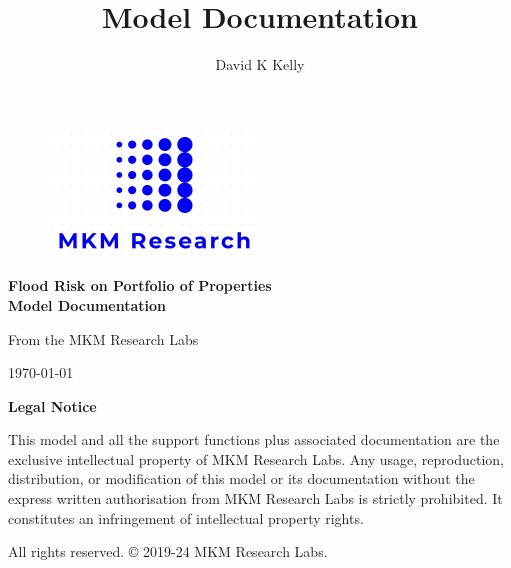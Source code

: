 \documentclass{article}
\title{Model Documentation}
\author{David K Kelly}
\date{}
\begin{document}
\begin{titlepage}
\begin{center}

\begin{figure}
	\centering
	\includegraphics[width=0.5\textwidth]{MKM.png}
\end{figure}

\vspace{2cm}

{\Huge\bfseries Flood Risk on Portfolio of Properties\\Model Documentation\par}

\vspace{2cm}

{\Large From the MKM Research Labs\par}

\vspace{1cm}

{\large \today\par}

\end{center}
\end{titlepage}
\newpage

\tableofcontents

\newpage
\begin{center}
\large\textbf{Legal Notice}



\vspace{2em}

\noindent This model and all the support functions plus associated documentation are the exclusive intellectual property of MKM Research Labs. Any usage, reproduction, distribution, or modification of this model or its documentation without the express written authorisation from MKM Research Labs is strictly prohibited.   It constitutes an infringement of intellectual property rights. 

\vspace{1em}

\noindent All rights reserved. © 2019-24 MKM Research Labs.

\vspace{2em}
\end{center}
\clearpage
\end{document}
